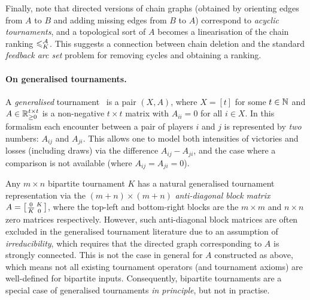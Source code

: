 Finally, note that directed versions of chain graphs (obtained by orienting
edges from $A$ to $B$ and adding missing edges from $B$ to $A$) correspond to
\emph{acyclic tournaments}, and a topological sort of $A$ becomes a
linearisation of the chain ranking $\leqslant^{\mathcal{A}}_K$. This suggests a connection
between chain deletion and the standard \emph{feedback arc set} problem for
removing cycles and obtaining a ranking.

\paragraph{On generalised tournaments.}
%
A \emph{generalised} tournament~\cite{gonzalez2014paired} is a pair $(X, A)$,
where $X = [t]$ for some $t \in \mathbb{N}$ and $A \in \mathbb{R}_{\ge 0}^{t \times t}$ is a
non-negative $t \times t$ matrix with $A_{ii} = 0$ for all $i \in X$. In this
formalism each encounter between a pair of players $i$ and $j$ is represented
by \emph{two} numbers: $A_{ij}$ and $A_{ji}$. This allows one to model both
intensities of victories and losses (including draws) via the difference
$A_{ij} - A_{ji}$, and the case where a comparison is not available (where
$A_{ij} = A_{ji} = 0$).

Any $m \times n$ bipartite tournament $K$ has a natural generalised tournament
representation via the $(m + n) \times (m + n)$ \emph{anti-diagonal block
matrix}
$
    A = \left[\begin{smallmatrix}
        0 & K \\
        {\overline{K}} & 0
    \end{smallmatrix}\right]
$, where the top-left and bottom-right blocks are the $m \times m$ and $n
\times n$ zero matrices respectively.  However, such anti-diagonal block
matrices are often excluded in the generalised tournament literature due to an
assumption of \emph{irreducibility}, which requires that the directed graph
corresponding to $A$ is strongly connected. This is not the case in general for
$A$ constructed as above, which means not all existing tournament
operators (and tournament axioms) are well-defined for bipartite
inputs.\footnotemark{} Consequently, bipartite tournaments are a special case
of generalised tournaments \emph{in principle}, but not in practise.


